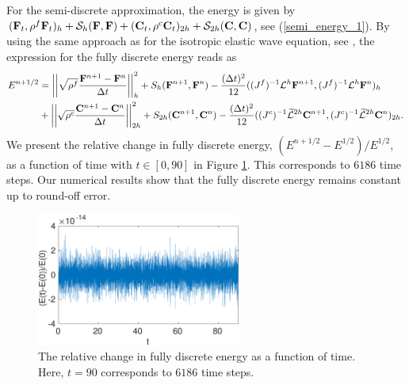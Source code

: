 For the semi-discrete approximation, the energy is given by $({\bf F}_t,{\rho}^f{\bf F}_t)_h + \mathcal{S}_h({\bf F},{\bf F}) + ({\bf C}_t,{\rho}^{c}{\bf C}_t)_{2h} + \mathcal{S}_{2h}({\bf C},{\bf C})$, see (\ref{semi_energy_1}). By using the same approach as for the isotropic elastic wave equation, see \cite{petersson2015wave,sjogreen2012fourth},  the expression for the fully discrete energy reads as
\begin{align*}
E^{n+1/2} &= \left|\left|\sqrt{{\rho}^f}\frac{{\bf F}^{n+1}-{\bf F}^n}{\Delta t}\right|\right|_h^2 + S_h({\bf F}^{n+1},{\bf F}^n) - \frac{(\Delta t)^2}{12}((J^f)^{-1}\mathcal{L}^h{\bf F}^{n+1},(J^f)^{-1}\mathcal{L}^h{\bf F}^n)_h\\
&+ \left|\left|\sqrt{{\rho}^{c}}\frac{{\bf C}^{n+1}-{\bf C}^n}{\Delta t}\right|\right|_{2h}^2 + S_{2h}({\bf C}^{n+1},{\bf C}^n) - \frac{(\Delta t)^2}{12}((J^c)^{-1}\widetilde{\mathcal{L}}^{2h}{\bf C}^{n+1},(J^c)^{-1}\widetilde{\mathcal{L}}^{2h}{\bf C}^n)_{2h}.
\end{align*}
We present the relative change in fully discrete energy, $(E^{n+1/2}-E^{1/2})/E^{1/2}$, as a function of time with $t\in[0,90]$ in Figure \ref{discrete_energy}. This corresponds to $6186$ time steps. Our numerical results show that the fully discrete energy remains constant up to round-off error.
\begin{figure}[htbp]
	\centering
	\includegraphics[width=0.6\textwidth,trim={0cm 0cm 0cm 0cm}, clip]{discrete_energy.eps}
	\caption{The relative change in fully discrete energy as a function of time. Here, $t = 90$ corresponds to $6186$ time steps.}\label{discrete_energy}
\end{figure}


